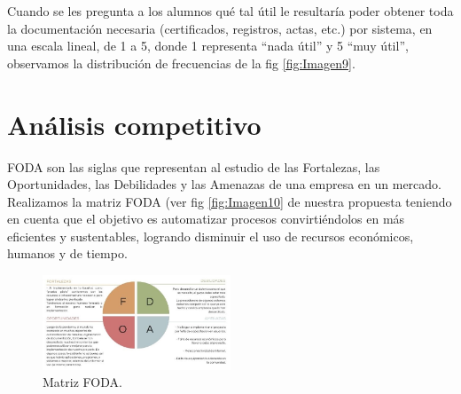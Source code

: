 \documentclass[a4paper]{article}
\begin{document}
Cuando se les pregunta a los alumnos qué tal útil le resultaría poder obtener toda la documentación necesaria (certificados, registros, actas, etc.) por sistema, en una escala lineal, de 1 a 5, donde 1 representa “nada útil” y 5 “muy útil”, observamos la distribución de frecuencias de la fig \ref{fig:Imagen9}.

\section{Análisis competitivo}

FODA son las siglas que representan al estudio de las Fortalezas, las Oportunidades, las Debilidades y las Amenazas de una empresa en un mercado. 
Realizamos la matriz FODA (ver fig \ref{fig:Imagen10} de nuestra propuesta teniendo en cuenta que el objetivo es automatizar procesos convirtiéndolos en más eficientes y sustentables, logrando disminuir el uso de recursos económicos, humanos y de tiempo.

\begin{figure}
\centering
\includegraphics[width=0.5\textwidth]{Imagen10.jpg}
\caption{\label{fig:Imagen0}Matriz FODA.}
\end{figure}

% 
% 
% 





\end{document}
